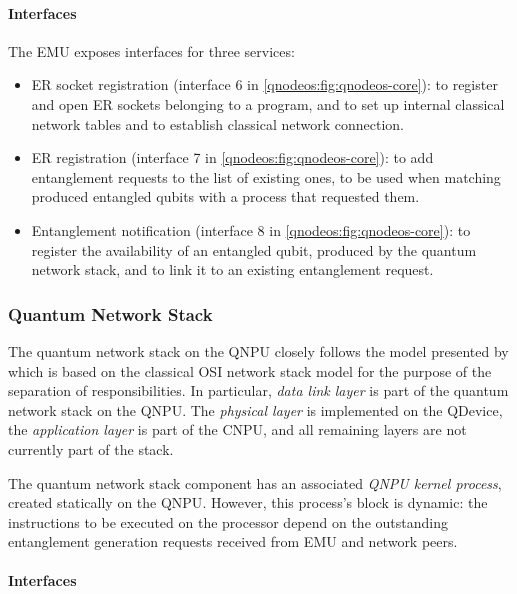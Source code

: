 \paragraph{Interfaces}

The \ac{EMU} exposes interfaces for three services:
%
\begin{itemize}
\item \ac{ER} socket registration (interface 6 in \cref{qnodeos:fig:qnodeos-core}): to register and open \ac{ER} sockets belonging to a program, and to set up internal classical network tables and to establish classical network connection.
\item \ac{ER} registration (interface 7 in \cref{qnodeos:fig:qnodeos-core}): to add entanglement requests to the list of existing ones, to be used when matching produced entangled qubits with a process that requested them.
\item Entanglement notification (interface 8 in \cref{qnodeos:fig:qnodeos-core}): to register the availability of an entangled qubit, produced by the quantum network stack, and to link it to an existing entanglement request.
\end{itemize}

\subsubsection{Quantum Network Stack}

The quantum network stack on the \ac{QNPU} closely follows the model presented by
\textcite{dahlberg_2019_egp} which is based on the classical \ac{OSI} network stack model for the purpose of the separation of responsibilities. In particular, \emph{data link layer} is part of the quantum network stack on the \ac{QNPU}. The \emph{physical layer} is implemented on the \ac{QDevice}, the \emph{application layer} is part of the \ac{CNPU}, and all remaining layers are not currently part of the stack.

The quantum network stack component has an associated \emph{\ac{QNPU} kernel process}, created statically on the \ac{QNPU}. However, this process's block is dynamic: the instructions to be executed on the processor depend on the outstanding entanglement generation requests received from \ac{EMU} and network peers.

\paragraph{Interfaces}

